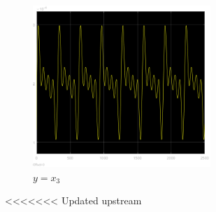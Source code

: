 \documentclass{article}
\begin{document}
\begin{figure}[!h]
    \centering
     \includegraphics[width=0.6\textwidth]{grafici/x3_2.png}
     \caption*{$y=x_3$}
\end{figure}
<<<<<<< Updated upstream
\end{document}
